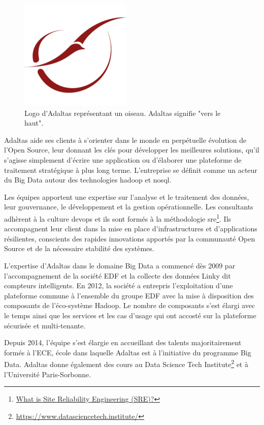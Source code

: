 \documentclass[12pt, french]{report}
\begin{document}
\begin{figure}[H]
\includegraphics[scale=0.4]{assets/img/logo-adaltas.png}
\centering
\caption{Logo d'Adaltas représentant un oiseau. Adaltas signifie "vers le haut".}
\label{fig:logo-adaltas}
\end{figure}

Adaltas aide ses clients à s’orienter dans le monde en perpétuelle évolution de l’Open Source, leur donnant les clés pour développer les meilleures solutions, qu’il s’agisse simplement d’écrire une application ou d’élaborer une plateforme de traitement stratégique à plus long terme. L'entreprise se définit comme un acteur du Big Data autour des technologies \gls{hadoop} et \gls{nosql}.

Les équipes apportent une expertise sur l’analyse et le traitement des données, leur gouvernance, le développement et la gestion opérationnelle. Les consultants adhèrent à la culture \gls{devops} et ils sont formés à la méthodologie \gls{sre}\footnote{\href{https://landing.google.com/sre/}{What is Site Reliability Engineering (SRE)?}}. Ils accompagnent leur client dans la mise en place d’infrastructures et d’applications résilientes, conscients des rapides innovations apportés par la communauté Open Source et de la nécessaire stabilité des systèmes.

L'expertise d'Adaltas dans le domaine Big Data a commencé dès 2009 par l'accompagnement de la société EDF et la collecte des données Linky dit compteurs intelligents. En 2012, la société a entrepris l’exploitation d'une plateforme commune à l'ensemble du groupe EDF avec la mise à disposition des composants de l’éco-système Hadoop. Le nombre de composants s'est élargi avec le temps ainsi que les services et les cas d’usage qui ont accosté sur la plateforme sécurisée et multi-tenante.

Depuis 2014, l’équipe s’est élargie en accueillant des talents majoritairement formés à l’ECE, école dans laquelle Adaltas est à l’initiative du programme Big Data. Adaltas donne également des cours au Data Science Tech Institute\footnote{\href{https://www.datasciencetech.institute/}{https://www.datasciencetech.institute/}} et à l’Université Paris-Sorbonne.
\end{document}
